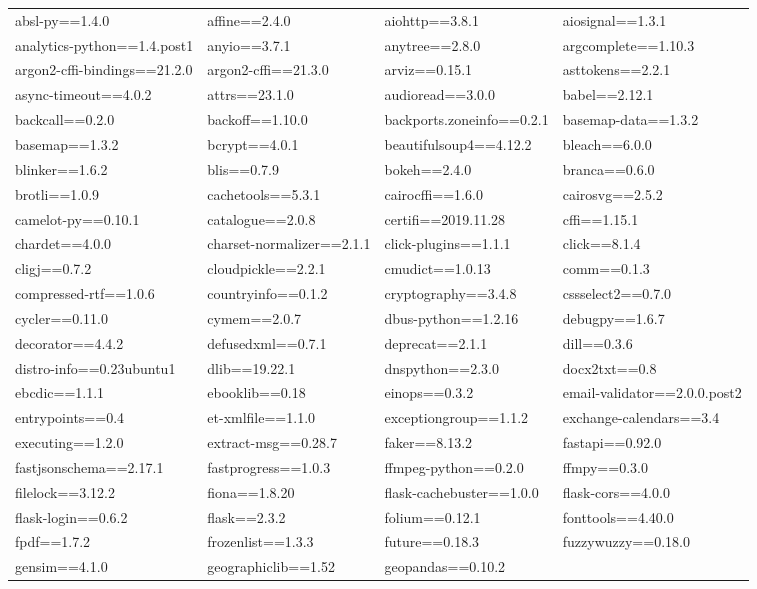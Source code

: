 \tiny
\begin{tabular}{l l l l}
absl-py==1.4.0 & affine==2.4.0 & aiohttp==3.8.1 & aiosignal==1.3.1 \\ analytics-python==1.4.post1 & anyio==3.7.1 & anytree==2.8.0 & 
argcomplete==1.10.3 \\ argon2-cffi-bindings==21.2.0 & argon2-cffi==21.3.0 & arviz==0.15.1 & asttokens==2.2.1 \\ async-timeout==4.0.2 & attrs==23.1.0 & 
audioread==3.0.0 & babel==2.12.1 \\ backcall==0.2.0 & backoff==1.10.0 & backports.zoneinfo==0.2.1 & basemap-data==1.3.2 \\ basemap==1.3.2 & 
bcrypt==4.0.1 & beautifulsoup4==4.12.2 & bleach==6.0.0 \\ blinker==1.6.2 & blis==0.7.9 & bokeh==2.4.0 & branca==0.6.0 \\ 
brotli==1.0.9 & cachetools==5.3.1 & cairocffi==1.6.0 & cairosvg==2.5.2 \\ camelot-py==0.10.1 & catalogue==2.0.8 & certifi==2019.11.28 & 
cffi==1.15.1 \\ chardet==4.0.0 & charset-normalizer==2.1.1 & click-plugins==1.1.1 & click==8.1.4 \\ cligj==0.7.2 & cloudpickle==2.2.1 & 
cmudict==1.0.13 & comm==0.1.3 \\ compressed-rtf==1.0.6 & countryinfo==0.1.2 & cryptography==3.4.8 & cssselect2==0.7.0 \\ cycler==0.11.0 & 
cymem==2.0.7 & dbus-python==1.2.16 & debugpy==1.6.7 \\ decorator==4.4.2 & defusedxml==0.7.1 & deprecat==2.1.1 & dill==0.3.6 \\ 
distro-info==0.23ubuntu1 & dlib==19.22.1 & dnspython==2.3.0 & docx2txt==0.8 \\ ebcdic==1.1.1 & ebooklib==0.18 & einops==0.3.2 & 
email-validator==2.0.0.post2 \\ entrypoints==0.4 & et-xmlfile==1.1.0 & exceptiongroup==1.1.2 & exchange-calendars==3.4 \\ executing==1.2.0 & extract-msg==0.28.7 & 
faker==8.13.2 & fastapi==0.92.0 \\ fastjsonschema==2.17.1 & fastprogress==1.0.3 & ffmpeg-python==0.2.0 & ffmpy==0.3.0 \\ filelock==3.12.2 & 
fiona==1.8.20 & flask-cachebuster==1.0.0 & flask-cors==4.0.0 \\ flask-login==0.6.2 & flask==2.3.2 & folium==0.12.1 & fonttools==4.40.0 \\ 
fpdf==1.7.2 & frozenlist==1.3.3 & future==0.18.3 & fuzzywuzzy==0.18.0 \\ gensim==4.1.0 & geographiclib==1.52 & geopandas==0.10.2 & 

\end{tabular}
